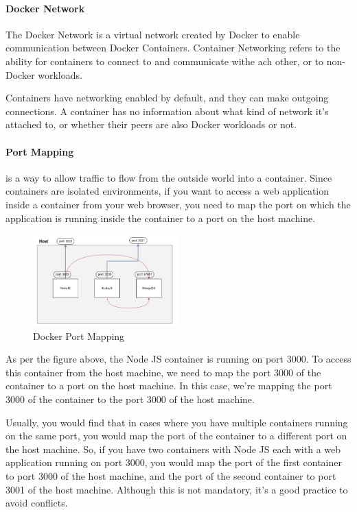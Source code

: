 \documentclass[a4paper]{article}
\begin{document}
    \paragraph*{Docker Network} The Docker Network  is a virtual network created by Docker to enable communication between Docker Containers. Container Networking refers to the ability for containers to connect to and communicate withe ach other, or to non-Docker workloads.

    Containers have networking enabled by default, and they can make outgoing connections. A container has no information about what kind of network it's attached to, or whether their peers are also Docker workloads or not. 

    \paragraph*{Port Mapping} is a way to allow traffic to flow from the outside world into a container. Since containers are isolated environments, if you want to access a web application inside a container from your web browser, you need to map the port on which the application is running inside the container to a port on the host machine.

    \begin{figure}[h]
        \centering
        \includegraphics[width=0.5\textwidth]{img/docker-port-mapping.png}
        \caption{Docker Port Mapping}
        \label{fig:docker-port-mapping}
    \end{figure}

    As per the figure above, the Node JS container is running on port 3000. To access this container from the host machine, we need to map the port 3000 of the container to a port on the host machine. In this case, we're mapping the port 3000 of the container to the port 3000 of the host machine. 

    Usually, you would find that in cases where you have multiple containers running on the same port, you would map the port of the container to a different port on the host machine. So, if you have two containers with Node JS each with a web application running on port 3000, you would map the port of the first container to port 3000 of the host machine, and the port of the second container to port 3001 of the host machine. Although this is not mandatory, it's a good practice to avoid conflicts.
\end{document}
